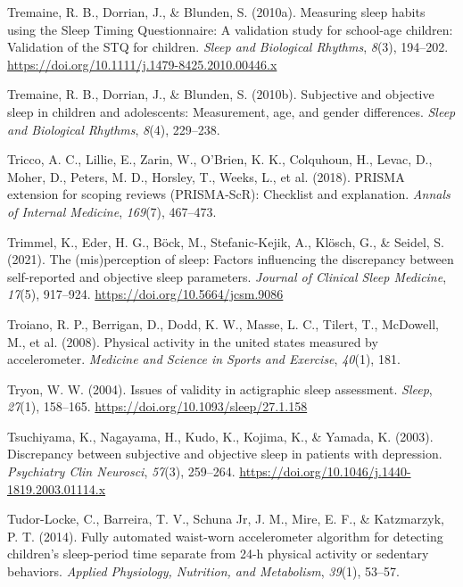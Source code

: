 \documentclass[
]{article}
\newlength{\cslhangindent}
\newenvironment{CSLReferences}[2] %
 {\begin{list}{}{%
  \setlength{\itemindent}{0pt}
  \setlength{\leftmargin}{0pt}
  \setlength{\parsep}{0pt}
  \ifodd #1
   \setlength{\leftmargin}{\cslhangindent}
   \setlength{\itemindent}{-1\cslhangindent}
  \fi
  \setlength{\itemsep}{#2\baselineskip}}}
 {\end{list}}
\begin{document}
\begin{CSLReferences}{1}{0}
Tremaine, R. B., Dorrian, J., \& Blunden, S. (2010a). Measuring sleep habits using the {Sleep} {Timing} {Questionnaire}: {A} validation study for school-age children: {Validation} of the {STQ} for children. \emph{Sleep and Biological Rhythms}, \emph{8}(3), 194--202. \url{https://doi.org/10.1111/j.1479-8425.2010.00446.x}

Tremaine, R. B., Dorrian, J., \& Blunden, S. (2010b). Subjective and objective sleep in children and adolescents: Measurement, age, and gender differences. \emph{Sleep and Biological Rhythms}, \emph{8}(4), 229--238.

Tricco, A. C., Lillie, E., Zarin, W., O'Brien, K. K., Colquhoun, H., Levac, D., Moher, D., Peters, M. D., Horsley, T., Weeks, L., et al. (2018). PRISMA extension for scoping reviews (PRISMA-ScR): Checklist and explanation. \emph{Annals of Internal Medicine}, \emph{169}(7), 467--473.

Trimmel, K., Eder, H. G., Böck, M., Stefanic-Kejik, A., Klösch, G., \& Seidel, S. (2021). The (mis)perception of sleep: Factors influencing the discrepancy between self-reported and objective sleep parameters. \emph{Journal of Clinical Sleep Medicine}, \emph{17}(5), 917--924. \url{https://doi.org/10.5664/jcsm.9086}

Troiano, R. P., Berrigan, D., Dodd, K. W., Masse, L. C., Tilert, T., McDowell, M., et al. (2008). Physical activity in the united states measured by accelerometer. \emph{Medicine and Science in Sports and Exercise}, \emph{40}(1), 181.

Tryon, W. W. (2004). {Issues of validity in actigraphic sleep assessment}. \emph{Sleep}, \emph{27}(1), 158--165. \url{https://doi.org/10.1093/sleep/27.1.158}

Tsuchiyama, K., Nagayama, H., Kudo, K., Kojima, K., \& Yamada, K. (2003). Discrepancy between subjective and objective sleep in patients with depression. \emph{Psychiatry Clin Neurosci}, \emph{57}(3), 259--264. \url{https://doi.org/10.1046/j.1440-1819.2003.01114.x}

Tudor-Locke, C., Barreira, T. V., Schuna Jr, J. M., Mire, E. F., \& Katzmarzyk, P. T. (2014). Fully automated waist-worn accelerometer algorithm for detecting children's sleep-period time separate from 24-h physical activity or sedentary behaviors. \emph{Applied Physiology, Nutrition, and Metabolism}, \emph{39}(1), 53--57.


\end{CSLReferences}
\end{document}
